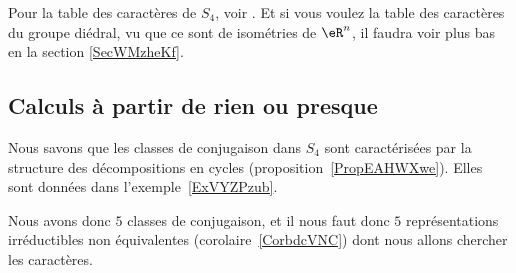 Pour la table des caractères de \( S_4\), voir \cite{KXjFWKA}. Et si vous voulez la table des caractères du groupe diédral, vu que ce sont de isométries de \( \eR^n\), il faudra voir plus bas en la section \ref{SecWMzheKf}.

\subsection{Calculs à partir de rien ou presque}

Nous savons que les classes de conjugaison dans \( S_4\) sont caractérisées par la structure des décompositions en cycles (proposition~\ref{PropEAHWXwe}). Elles sont données dans l'exemple~\ref{ExVYZPzub}.

Nous avons donc \( 5\) classes de conjugaison, et il nous faut donc \( 5\) représentations irréductibles non équivalentes (corolaire~\ref{CorbdcVNC}) dont nous allons chercher les caractères.

